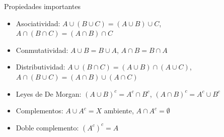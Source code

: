 \documentclass[14pt,aspectratio=169,xcolor=dvipsnames]{beamer}
\begin{document}
\begin{frame}{Propiedades importantes}
    \begin{small}
        \begin{itemize}
            \item Asociatividad: $A\cup(B\cup C) = (A\cup B)\cup C$, $A\cap(B\cap C) = (A\cap B) \cap C$
            \item Conmutatividad: $A\cup B = B\cup A$, $A\cap B=B\cap A$
            \item Distributividad: $A\cup(B\cap C) = (A\cup B)\cap (A\cup C)$, $A\cap(B\cup C) = (A\cap B)\cup (A\cap C)$ 
            \item Leyes de De Morgan: $(A\cup B)^c=A^c\cap B^c$, $(A\cap B)^c = A^c\cup B^c$
            \item Complementos: $A\cup A^c = X$ ambiente, $A\cap A^c = \emptyset$
            \item Doble complemento: $(A^c)^c = A$
        \end{itemize}
    \end{small}
\end{frame}
\begin{frame}
    \maketitle
\end{frame}
\end{document}
